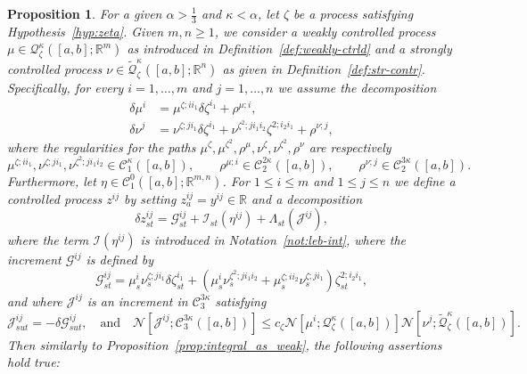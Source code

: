 \documentclass[12pt,reqno]{amsart}
\numberwithin{equation}{section}  %
\newcommand{\der}{\delta}
\newcommand{\1}{{\bf 1}}
\newcommand{\2}{{\bf 2}}
\newcommand{\bzeta}{{\zeta}}
\newcommand{\R}{\mathbb R}
\newcommand{\cac}{\mathcal C}
\newcommand{\cg}{\mathcal G}
\newcommand{\ci}{\mathcal I}
\newcommand{\cj}{\mathcal J}
\newcommand{\cn}{\mathcal N}
\newcommand{\cq}{\mathcal Q}
\newcommand{\al}{\alpha}
\newcommand{\ka}{\kappa}
\newcommand{\laa}{\Lambda}
\newcommand{\lp}{\left(}
\newcommand{\rp}{\right)}
\newtheorem{proposition}[theorem]{Proposition}
\theoremstyle{remark}
\theoremstyle{remark}
\newcommand{\beq}{\begin{equation}}
\newcommand{\eeq}{\end{equation}}
\begin{document}
\begin{proposition}\label{prop:integral_controlled}
For a given $\al > \frac{1}{3}$ and $\ka < \al$, let $\zeta$ be a process satisfying Hypothesis~\ref{hyp:zeta}. 
Given $m,n \geq 1$, we consider a weakly controlled process $\mu \in \cq_{\bzeta}^{\ka}([a,b]; \R^m)$ as introduced in Definition~\ref{def:weakly-ctrld} and a strongly controlled process $\nu \in \tilde{\cq}_{\zeta}^{\ka}([a,b]; \R^n)$ as given in Definition~\ref{def:str-contr}. Specifically, for every $i=1, \ldots , m$ and $j=1, \ldots, n$ we assume the decomposition
\begin{align}
\der \mu^i &= \mu^{\zeta;i i_1} \der \zeta^{i_1} + \rho^{\mu; i}, \label{eq:int_contr-g} \\ %
\der \nu^j &= \nu^{\zeta;j i_1} \der \zeta^{i_1} + \nu^{\bzeta^2; j i_1 i_2}\bzeta^{2; i_2 i_1} +  \rho^{\nu;j}, \label{eq:int_contr-h}%
\end{align}
where the regularities for the paths $\mu^{\bzeta}, \mu^{\bzeta^2}, \rho^{\mu}, \nu^{\bzeta}, \nu^{\bzeta^2}, \rho^{\nu}$ are respectively
\begin{equation*}
\mu^{\bzeta; i i_1}, \nu^{\bzeta; j i_1}, \nu^{\bzeta^2; j i_1 i_2} \in \cac_1^{\ka}([a,b]), \qquad
\rho^{\mu; i} \in \cac_2^{2 \ka} ([a,b]), \qquad
\rho^{\nu; j} \in \cac_2^{3 \ka} ([a,b]).
\end{equation*}
Furthermore, let $\eta \in \cac_1^0([a,b]; \R^{m, n})$. For $1 \leq i \leq m$ and $1\leq j \leq n$ we define a controlled process $z^{ij}$ by setting $z_a^{ij} = y^{ij} \in \R$ and a decomposition
\beq\label{eq:int_contr-e}
\der z_{st}^{ij} = \cg_{st}^{ij} + \ci_{st}(\eta^{ij}) + \laa_{st}\lp \cj^{ij} \rp,
\eeq
where the term $\ci(\eta^{ij})$ is introduced in Notation~\ref{not:leb-int}, where the increment $\cg^{ij}$ is defined by 
\beq\label{eq:int_contr-i}
\cg_{st}^{ij} = \mu_s^i \nu_s^{\bzeta;j i_1} \der \bzeta_{st}^{i_1} + \lp \mu_s^i \nu_s^{\bzeta^2; j i_1 i_2} + \mu_s^{\bzeta; i i_2} \nu_s^{\bzeta; j i_1} \rp \bzeta_{st}^{2; i_2 i_1},
\eeq
and where $\cj^{i j}$ is an increment in $\cac_3^{3\ka}$ satisfying
\beq\label{eq:int_contr-f}
\cj_{sut}^{i j} = - \der \cg_{sut}^{ij}, 
\quad \text{and} \quad
\cn[\cj^{ij}; \cac_3^{3\ka}([a,b])] \leq c_{\bzeta} \cn[\mu^i; \cq_{\zeta}^{\ka}([a,b])] \cn[\nu^j; \tilde{\cq}_{\zeta}^{\ka}([a,b])].
\eeq
Then similarly to Proposition~\ref{prop:integral_as_weak}, the following assertions hold true:
\begin{enumerate}[wide, labelwidth=!, labelindent=0pt, label=\textnormal{(\arabic*)}]
\setlength\itemsep{.02in}


\end{enumerate}
\end{proposition}
\end{document}

